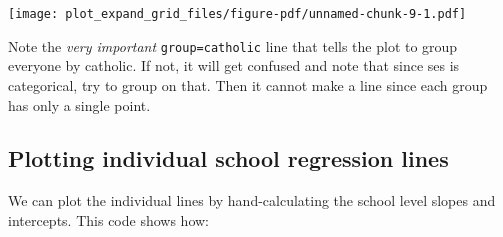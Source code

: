 \documentclass[
  letterpaper,
  DIV=11,
  numbers=noendperiod]{scrreprt}
\newenvironment{Shaded}{}{}
\newcommand{\AttributeTok}[1]{\textcolor[rgb]{0.49,0.56,0.16}{#1}}
\newcommand{\DecValTok}[1]{\textcolor[rgb]{0.25,0.63,0.44}{#1}}
\newcommand{\FunctionTok}[1]{\textcolor[rgb]{0.02,0.16,0.49}{#1}}
\newcommand{\NormalTok}[1]{#1}
\newcommand{\OtherTok}[1]{\textcolor[rgb]{0.00,0.44,0.13}{#1}}
\newcommand{\SpecialCharTok}[1]{\textcolor[rgb]{0.25,0.44,0.63}{#1}}
\newcommand{\StringTok}[1]{\textcolor[rgb]{0.25,0.44,0.63}{#1}}
\begin{document}
\begin{Shaded}
\end{Shaded}

\texttt{[image: plot\_expand\_grid\_files/figure-pdf/unnamed-chunk-9-1.pdf]}

Note the \emph{very important} \texttt{group=catholic} line that tells
the plot to group everyone by catholic. If not, it will get confused and
note that since ses is categorical, try to group on that. Then it cannot
make a line since each group has only a single point.

\subsection{Plotting individual school regression
lines}\label{plotting-individual-school-regression-lines}

We can plot the individual lines by hand-calculating the school level
slopes and intercepts. This code shows how:

\begin{Shaded}
\end{Shaded}
\end{document}
